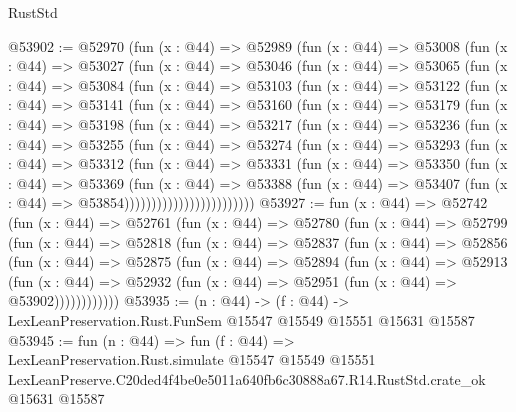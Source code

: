 \begin{lexlean}{RustStd}
\begin{coremodule}
@53902 := @52970
    (fun (x : @44) =>
    @52989
      (fun (x : @44) =>
      @53008
        (fun (x : @44) =>
        @53027
          (fun (x : @44) =>
          @53046
            (fun (x : @44) =>
            @53065
              (fun (x : @44) =>
              @53084
                (fun (x : @44) =>
                @53103
                  (fun (x : @44) =>
                  @53122
                    (fun (x : @44) =>
                    @53141
                      (fun (x : @44) =>
                      @53160
                        (fun (x : @44) =>
                        @53179
                          (fun (x : @44) =>
                          @53198
                            (fun (x : @44) =>
                            @53217
                              (fun (x : @44) =>
                              @53236
                                (fun (x : @44) =>
                                @53255
                                  (fun (x : @44) =>
                                  @53274
                                    (fun (x : @44) =>
                                    @53293
                                      (fun (x : @44) =>
                                      @53312
                                        (fun (x : @44) =>
                                        @53331
                                          (fun (x : @44) =>
                                          @53350
                                            (fun (x : @44) =>
                                            @53369
                                              (fun (x : @44) =>
                                              @53388
                                                (fun (x : @44) =>
                                                @53407
                                                  (fun (x : @44) => @53854))))))))))))))))))))))))
@53927 := fun (x : @44) =>
  @52742
    (fun (x : @44) =>
    @52761
      (fun (x : @44) =>
      @52780
        (fun (x : @44) =>
        @52799
          (fun (x : @44) =>
          @52818
            (fun (x : @44) =>
            @52837
              (fun (x : @44) =>
              @52856
                (fun (x : @44) =>
                @52875
                  (fun (x : @44) =>
                  @52894
                    (fun (x : @44) =>
                    @52913
                      (fun (x : @44) =>
                      @52932 (fun (x : @44) => @52951 (fun (x : @44) => @53902))))))))))))
@53935 := (n : @44) ->
  (f : @44) -> LexLeanPreservation.Rust.FunSem @15547 @15549 @15551 @15631 @15587
@53945 := fun (n : @44) =>
  fun (f : @44) =>
  LexLeanPreservation.Rust.simulate
    @15547
    @15549
    @15551
    LexLeanPreserve.C20ded4f4be0e5011a640fb6c30888a67.R14.RustStd.crate_ok
    @15631
    @15587
\end{coremodule}
\end{lexlean}
